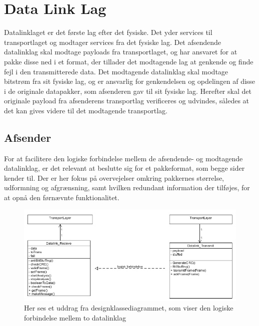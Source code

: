 \section{Data Link Lag}
Datalinklaget er det første lag efter det fysiske. Det yder services til transportlaget og modtager services fra det fysiske lag.
    Det afsendende datalinklag skal modtage payloads fra transportlaget, og har ansvaret for at pakke disse ned i et format, der tillader det modtagende lag at genkende og finde fejl i den transmitterede data.
    Det modtagende datalinklag skal modtage bitstrøm fra sit fysiske lag, og er ansvarlig for genkendelsen og opdelingen af disse i de originale datapakker, som afsenderen gav til sit fysiske lag. Herefter skal det originale payload fra afsenderens transportlag verificeres og udvindes, således at det kan gives videre til det modtagende transportlag.

\subsection{Afsender}
For at facilitere den logiske forbindelse mellem de afsendende- og modtagende datalinklag, er det relevant at beslutte sig for et pakkeformat, som begge sider kender til. Der er her fokus på overvejelser omkring pakkernes størrelse, udformning og afgrænsning, samt hvilken redundant information der tilføjes, for at opnå den førnævnte funktionalitet.

\begin{figure}[h]
\centering
\includegraphics[scale=0.7]{Billeder/DataLinkLogical.PNG}
\caption{Her ses et uddrag fra designklassediagrammet, som viser den logiske forbindelse mellem to datalinklag}
\label{fig:DataLinkLogical}
\end{figure}

